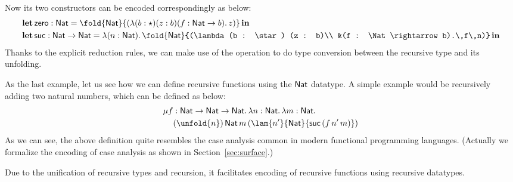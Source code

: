 Now its two constructors can be encoded correspondingly as below:
\begin{align*}
  \letbb\,&\zero : \Nat = \fold{\Nat}{(\lambda (b : \star) (z : b) (f : \Nat \rightarrow b).\,z)}\,\inb \\
  \letbb\,&\suc : \Nat \rightarrow \Nat = \lambda (n : \Nat).\,\fold{\Nat}{(\lambda (b : \star) (z : b)\\ &(f : \Nat \rightarrow b).\,f\,n)}\,\inb
\end{align*}
Thanks to the explicit reduction rules, we can make use of the \castup operation to do type conversion between the recursive type and its unfolding.

As the last example, let us see how we can define recursive functions using the $\mathsf{Nat}$ datatype. A simple example would be recursively adding two natural numbers, which can be defined as below:
\begin{align*}
  \mu f &: \Nat \rightarrow \Nat \rightarrow \Nat.\,\lambda n : \Nat.\,\lambda m : \Nat.\\
  &(\unfold{n})\,\Nat\,m\,(\lam{n'}{\Nat}{\suc\,(f\,n'\,m)})
\end{align*}
As we can see, the above definition quite resembles the case analysis common in modern functional programming languages. (Actually we formalize the encoding of case analysis as shown in Section~\ref{sec:surface}.)

Due to the unification of recursive types and recursion, it facilitates encoding of recursive functions using recursive datatypes.

